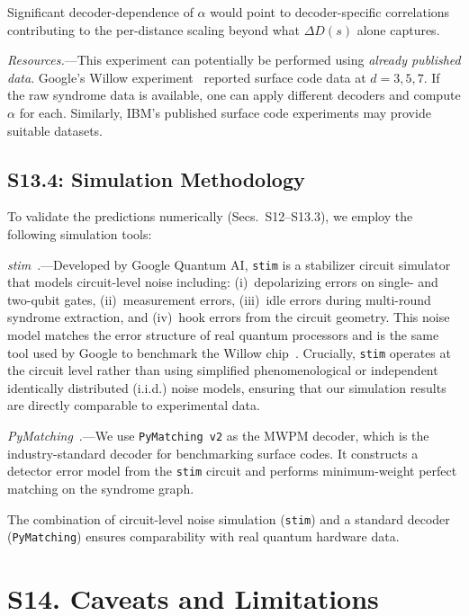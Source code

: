 \documentclass[prl,twocolumn,superscriptaddress,longbibliography]{revtex4-2}
\begin{document}
Significant decoder-dependence of $\alpha$ would point to
decoder-specific correlations contributing to the per-distance scaling
beyond what $\Delta D(s)$ alone captures.

\emph{Resources.}---This experiment can potentially be performed using
\emph{already published data}. Google's Willow experiment~\cite{Acharya2025}
reported surface code data at $d = 3, 5, 7$. If the raw syndrome data
is available, one can apply different decoders and compute
$\alpha$ for each. Similarly, IBM's published surface code
experiments may provide suitable datasets.

\subsection{S13.4: Simulation Methodology}

To validate the predictions numerically (Secs.~S12--S13.3), we employ
the following simulation tools:

\emph{stim}~\cite{Gidney2021}.---Developed by Google Quantum AI,
\texttt{stim} is a stabilizer circuit simulator that models
circuit-level noise including:
(i)~depolarizing errors on single- and two-qubit gates,
(ii)~measurement errors,
(iii)~idle errors during multi-round syndrome extraction, and
(iv)~hook errors from the circuit geometry.
This noise model matches the error structure of real quantum
processors and is the same tool used by Google to benchmark the
Willow chip~\cite{Acharya2025}. Crucially, \texttt{stim} operates at
the circuit level rather than using simplified phenomenological or
independent identically distributed (i.i.d.) noise models, ensuring
that our simulation results are directly comparable to experimental
data.

\emph{PyMatching}~\cite{Higgott2025}.---We use
\texttt{PyMatching~v2} as the MWPM decoder, which is the
industry-standard decoder for benchmarking surface codes. It
constructs a detector error model from the \texttt{stim} circuit
and performs minimum-weight perfect matching on the syndrome graph.

The combination of circuit-level noise simulation (\texttt{stim})
and a standard decoder (\texttt{PyMatching}) ensures comparability
with real quantum hardware data.

\section{S14. Caveats and Limitations}
\label{sec:caveats}
\end{document}

